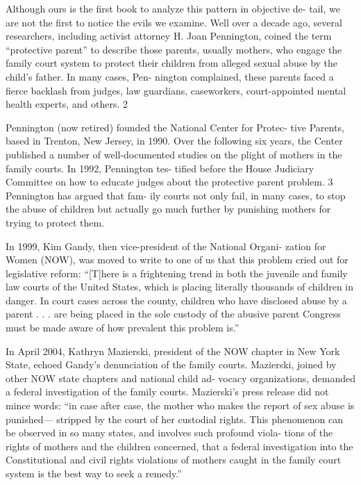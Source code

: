 Although ours is the first book to analyze this pattern in objective de-
tail, we are not the first to notice the evils we examine. Well over a decade
ago, several researchers, including activist attorney H. Joan Pennington,
coined the term “protective parent” to describe those parents, usually
mothers, who engage the family court system to protect their children
from alleged sexual abuse by the child’s father. In many cases, Pen-
nington complained, these parents faced a fierce backlash from judges,
law guardians, caseworkers, court-appointed mental health experts, and
others. 2 \pfl{}


Pennington (now retired) founded the National Center for Protec-
tive Parents, based in Trenton, New Jersey, in 1990. Over the following
six years, the Center published a number of well-documented studies
on the plight of mothers in the family courts. In 1992, Pennington tes-
tified before the House Judiciary Committee on how to educate judges
about the protective parent problem. 3 Pennington has argued that fam-
ily courts not only fail, in many cases, to stop the abuse of children but
actually go much further by punishing mothers for trying to protect
them. \pfl{}


In 1999, Kim Gandy, then vice-president of the National Organi-
zation for Women (NOW), was moved to write to one of us that this
problem cried out for legislative reform: “[T]here is a frightening trend
in both the juvenile and family law courts of the United States, which is
placing literally thousands of children in danger. In court cases across
the county, children who have disclosed abuse by a parent . . . are being
placed in the sole custody of the abusive parent Congress must be made
aware of how prevalent this problem is.” \pfl{}


In April 2004, Kathryn Mazierski, president of the NOW chapter
in New York State, echoed Gandy’s denunciation of the family courts.
Mazierski, joined by other NOW state chapters and national child ad-
vocacy organizations, demanded a federal investigation of the family
courts. Mazierski’s press release did not mince words: “in case after
case, the mother who makes the report of sex abuse is punished—
stripped by the court of her custodial rights. This phenomenon can
be observed in so many states, and involves such profound viola-
tions of the rights of mothers and the children concerned, that a
federal investigation into the Constitutional and civil rights violations
of mothers caught in the family court system is the best way to seek a
remedy.” \pfl{}


